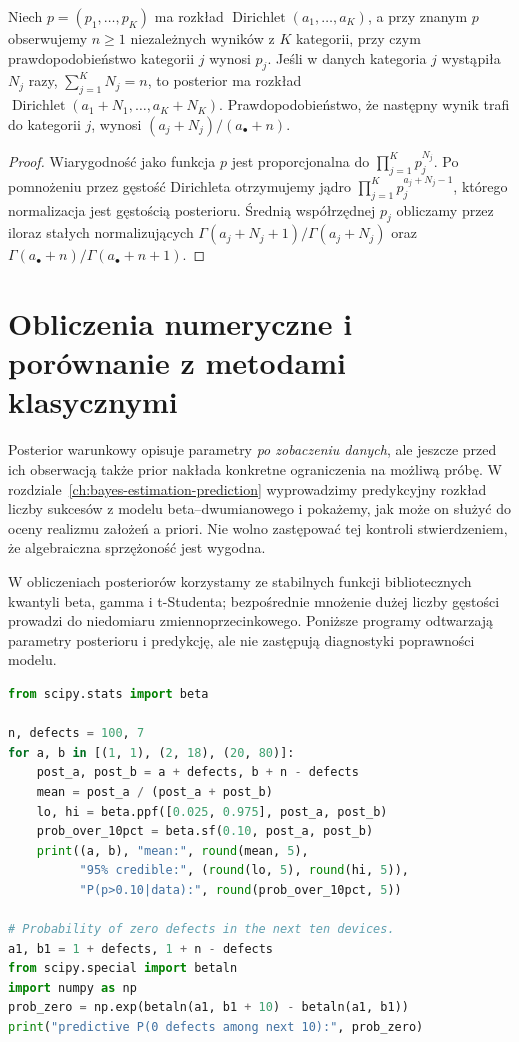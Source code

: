\begin{twierdzenie}
Niech $p=(p_1,\ldots,p_K)$ ma rozkład
$\operatorname{Dirichlet}(a_1,\ldots,a_K)$, a przy znanym $p$
obserwujemy $n\ge1$ niezależnych wyników z $K$ kategorii,
przy czym prawdopodobieństwo kategorii $j$ wynosi $p_j$.
Jeśli w danych kategoria $j$ wystąpiła $N_j$ razy,
$\sum_{j=1}^KN_j=n$, to posterior ma rozkład
$\operatorname{Dirichlet}(a_1+N_1,\ldots,a_K+N_K)$.
Prawdopodobieństwo, że następny wynik trafi do kategorii $j$,
wynosi $(a_j+N_j)/(a_\bullet+n)$.
\end{twierdzenie}
\begin{proof}
Wiarygodność jako funkcja $p$ jest proporcjonalna do
$\prod_{j=1}^Kp_j^{N_j}$. Po pomnożeniu przez gęstość
Dirichleta otrzymujemy jądro
$\prod_{j=1}^Kp_j^{a_j+N_j-1}$, którego normalizacja
jest gęstością posterioru. Średnią współrzędnej
$p_j$ obliczamy przez iloraz stałych normalizujących
$\Gamma(a_j+N_j+1)/\Gamma(a_j+N_j)$ oraz
$\Gamma(a_\bullet+n)/\Gamma(a_\bullet+n+1)$.
\end{proof}

\section{Obliczenia numeryczne i porównanie z metodami klasycznymi}
Posterior warunkowy opisuje parametry \emph{po zobaczeniu danych},
ale jeszcze przed ich obserwacją także prior nakłada konkretne
ograniczenia na możliwą próbę. W rozdziale~\ref{ch:bayes-estimation-prediction}
wyprowadzimy predykcyjny rozkład liczby sukcesów z modelu
beta--dwumianowego i pokażemy, jak może on służyć do oceny
realizmu założeń a priori. Nie wolno zastępować tej kontroli
stwierdzeniem, że algebraiczna sprzężoność jest wygodna.

W obliczeniach posteriorów korzystamy ze stabilnych funkcji
bibliotecznych kwantyli beta, gamma i t-Studenta; bezpośrednie
mnożenie dużej liczby gęstości prowadzi do niedomiaru
zmiennoprzecinkowego. Poniższe programy odtwarzają
parametry posterioru i predykcję, ale nie zastępują
diagnostyki poprawności modelu.

\begin{lstlisting}[language=Python,caption={Kompletny program: beta--dwumianowy, przedziały i test wrażliwości na prior (Python).}]
from scipy.stats import beta

n, defects = 100, 7
for a, b in [(1, 1), (2, 18), (20, 80)]:
    post_a, post_b = a + defects, b + n - defects
    mean = post_a / (post_a + post_b)
    lo, hi = beta.ppf([0.025, 0.975], post_a, post_b)
    prob_over_10pct = beta.sf(0.10, post_a, post_b)
    print((a, b), "mean:", round(mean, 5),
          "95% credible:", (round(lo, 5), round(hi, 5)),
          "P(p>0.10|data):", round(prob_over_10pct, 5))

# Probability of zero defects in the next ten devices.
a1, b1 = 1 + defects, 1 + n - defects
from scipy.special import betaln
import numpy as np
prob_zero = np.exp(betaln(a1, b1 + 10) - betaln(a1, b1))
print("predictive P(0 defects among next 10):", prob_zero)
\end{lstlisting}

